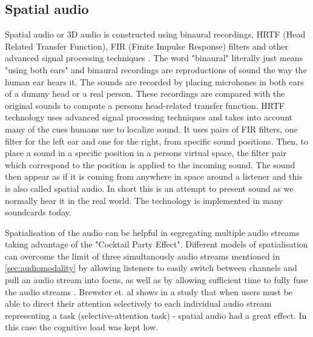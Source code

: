 \subsection{Spatial audio}
Spatial audio or 3D audio is constructed using binaural recordings, HRTF (Head Related Transfer Function), FIR (Finite Impulse Response) filters and other advanced signal processing techniques \cite{begault_3dd_1994}. The word "binaural" literally just means "using both ears" and binaural recordings are reproductions of sound the way the human ear hears it. The sounds are recorded by placing microhones in both ears of a dummy head or a real person. These recordings are compared with the original sounds to compute a persons head-related transfer function. HRTF technology uses advanced signal processing techniques and takes into account many of the cues humans use to localize sound. It uses pairs of FIR filters, one filter for the left ear and one for the right, from specific sound positions. Then, to place a sound in a specific position in a persons virtual space, the filter pair which correspond to the position is applied to the incoming sound. The sound then appear as if it is coming from anywhere in space around a listener and this is also called spatial audio. In short this is an attempt to present sound as we normally hear it in the real world. The technology is implemented in many soundcards today.

Spatialisation of the audio can be helpful in segregating multiple audio streams taking advantage of the "Cocktail Party Effect". Different models of spatialisation can overcome the limit of three simultanously audio streams mentioned in \ref{sec:audiomodality} by allowing listeners to easily switch between channels and pull an audio stream into focus, as well as by allowing sufficient time to fully fuse the audio streams \cite{bronkhorst_cocktail_2000}. Brewster et. al \cite{vazquez-alvarez_eyes-free_2011} shows in a study that when users must be able to direct their attention selectively to each individual audio stream representing a task (selective-attention task) - spatial audio had a great effect. In this case the cognitive load was kept low.

